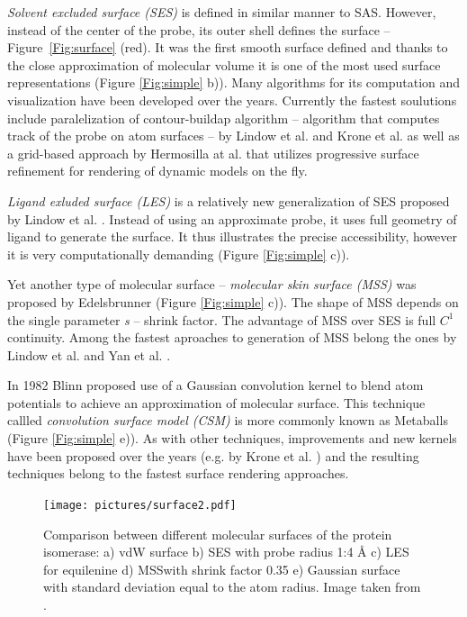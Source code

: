 \textit{Solvent excluded surface (SES)} \cite{richards1977areas} is defined in similar manner to SAS. However, instead of the center of the probe, its outer shell defines the surface -- Figure~\ref{Fig:surface} (red). It was the first smooth surface defined and thanks to the close approximation of molecular volume it is one of the most used surface representations (Figure \ref{Fig:simple} b)). Many algorithms for its computation and visualization have been developed over the years. Currently the fastest soulutions include paralelization of contour-buildap algorithm \cite{totrov1996contour} -- algorithm that computes track of the probe on atom surfaces -- by Lindow et al. \cite{lindow2010accelerated} and Krone et al. \cite{6094043} as well as a grid-based approach by Hermosilla at al. \cite{hermosilla2017interactive} that utilizes progressive surface refinement for rendering of dynamic models on the fly.

\textit{Ligand exluded surface (LES)} is a relatively new generalization of SES proposed by Lindow et al. \cite{lindow2014ligand}. Instead of using an approximate probe, it uses full geometry of ligand to generate the surface. It thus illustrates the precise accessibility, however it is very computationally demanding (Figure \ref{Fig:simple} c)).

Yet another type of molecular surface -- \textit{molecular skin surface (MSS)} was proposed by Edelsbrunner \cite{edelsbrunner1999deformable} (Figure \ref{Fig:simple} c)). The shape of MSS depends on the single parameter \textit{s} -- shrink factor. The advantage of MSS over SES is full $C^1$ continuity.  Among the fastest aproaches to generation of MSS belong the ones by Lindow et al. \cite{lindow2010accelerated} and Yan et al. \cite{Yan2017}.

In 1982 Blinn \cite{blinn1982generalization} proposed use of a Gaussian convolution
kernel to blend atom potentials to achieve an approximation of molecular surface. This technique callled \textit{convolution surface model (CSM)} is more commonly known as Metaballs (Figure \ref{Fig:simple} e)). As with other techniques, improvements and new kernels have been proposed over the years (e.g. by Krone et al. \cite{krone2012fast}) and the resulting techniques belong to the fastest surface rendering approaches. 

\begin{figure}[H]
  \centering
  \texttt{[image: pictures/surface2.pdf]} 
  \caption{Comparison between different molecular surfaces of the protein isomerase: a) vdW surface b) SES with probe radius 1:4 Å c) LES for equilenine d) MSSwith shrink factor 0.35 e) Gaussian surface with standard deviation equal to the atom radius. Image taken from \cite{kozlikova2015visualization}.}
  \label{Fig:surface2}  
\end{figure}


